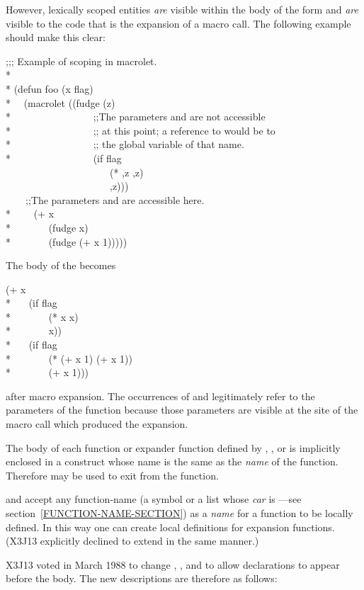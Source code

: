 \begin{defspec}
However,
lexically scoped entities \emph{are} visible
within the body of the  form and \emph{are} visible
to the code that is the expansion of a macro call.  The following example
should make this clear:
\begin{lisp}
;;; Example of scoping in macrolet. \\*
\\*
(defun foo (x flag) \\*
~~(macrolet ((fudge (z) \\*
~~~~~~~~~~~~~~~~;;\textrm{The parameters  and  are not accessible} \\*
~~~~~~~~~~~~~~~~;; \textrm{at this point; a reference to  would be to} \\*
~~~~~~~~~~~~~~~~;; \textrm{the global variable of that name.} \\*
~~~~~~~~~~~~~~~~{\Xbq}(if flag \\
~~~~~~~~~~~~~~~~~~~~~(* ,z ,z) \\
~~~~~~~~~~~~~~~~~~~~~,z))) \\
~~~~;;\textrm{The parameters  and  are accessible here.} \\*
~~~~(+ x \\*
~~~~~~~(fudge x) \\*
~~~~~~~(fudge (+ x 1)))))
\end{lisp}
The body of the  becomes
\begin{lisp}
(+ x \\*
~~~(if flag \\*
~~~~~~~(* x x) \\*
~~~~~~~x)) \\*
~~~(if flag \\*
~~~~~~~(* (+ x 1) (+ x 1)) \\*
~~~~~~~(+ x 1)))
\end{lisp}
after macro expansion.  The occurrences of  and  legitimately
refer to the parameters of the function  because those parameters are
visible at the site of the macro call which produced the expansion.

The body of each function or expander function defined
by , , or 
is implicitly enclosed in a  construct
whose name is the same as the \emph{name} of the function.
Therefore  may be used to exit from the function.

 and 
accept any function-name (a symbol or a list
whose \emph{car} is ---see section~\ref{FUNCTION-NAME-SECTION}) as a \emph{name}
for a function to be locally defined.  In this way one can create local definitions
for  expansion functions.  (X3J13 explicitly declined to extend
 in the same manner.)

\begin{new}
X3J13 voted in March 1988
to change , , and 
to allow declarations to appear before the body.
The new descriptions are therefore as follows:
\end{new}
\end{defspec}

